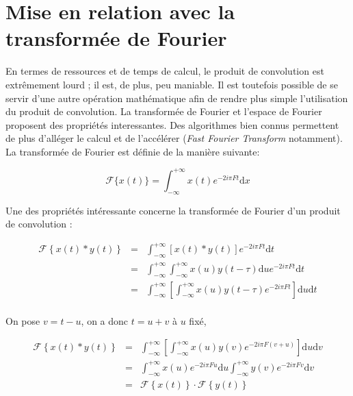 \section{Mise en relation avec la transformée de Fourier} %

En termes de ressources et de temps de calcul, le produit de convolution est extrêmement lourd ; il est, de plus, peu maniable.
Il est toutefois possible de se servir d'une autre opération mathématique afin de rendre plus simple l'utilisation du produit de convolution.
La transformée de Fourier et l'espace de Fourier proposent des propriétés interessantes. Des algorithmes bien connus permettent de plus d'alléger le calcul et de l'accélérer (\textit{Fast Fourier Transform} notamment).
La transformée de Fourier est définie de la manière suivante:

\begin{equation}
    \mathcal{F}\{x(t)\} = \int_{-\infty}^{+\infty} x(t) e^{-2i\pi Ft} \mathrm dx
\end{equation}

Une des propriétés intéressante concerne la transformée de Fourier d'un produit de convolution :

\begin{eqnarray*}
    \mathcal{F}\left\{x(t) \ast y(t)\right\} & = & \int_{-\infty}^{+\infty} \left[x(t) \ast y(t)\right] e^{-2i\pi Ft} \mathrm dt \\
    & = & \int_{-\infty}^{+\infty} \int_{-\infty}^{+\infty} x(u)y(t - \tau ) \mathrm du e^{-2i\pi Ft} \mathrm dt \\
    & = & \int_{-\infty}^{+\infty}  \left[ \int_{-\infty}^{+\infty} x(u)y(t - \tau )  e^{-2i\pi Ft} \right] \mathrm du \mathrm dt \\
\end{eqnarray*}

On pose $v= t- u$, on a donc $t= u+v$ à $u$ fixé,

\begin{eqnarray*}
    \mathcal{F}\left\{x(t) \ast y(t)\right\} & = & \int_{-\infty}^{+\infty}  \left[ \int_{-\infty}^{+\infty} x(u)y(v)  e^{-2i\pi F(v+u)} \right] \mathrm du \mathrm dv\\
    & = & \int_{-\infty}^{+\infty}  x(u) e^{-2i\pi Fu}  \mathrm du
    \int_{-\infty}^{+\infty} y(v) e^{-2i\pi Fv} \mathrm dv \\
    & = & \mathcal{F}\left\{x(t)\right\}\cdot\mathcal{F}\left\{y(t)\right\} \\
\end{eqnarray*}

